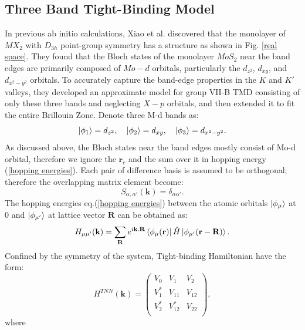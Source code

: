 \documentclass[12pt,english,a4paper]{article}
\begin{document}
	\subsection{Three Band Tight-Binding Model}
	\quad In previous ab initio calculations\cite{xiao_coupled_2012,mattheiss_band_1973,lebegue_electronic_2009,zhu_giant_2011,ataca_stable_2012}, Xiao et al. discovered that the monolayer of $MX_2$ with $D_{3h}$ point-group symmetry has a structure as shown in Fig. \ref{real space}. They found that the Bloch states of the monolayer $MoS_2$ near the band edges are primarily composed of $Mo-d$ orbitals, particularly the $d_{z^2}$, $d_{xy}$, and $d_{x^2-y^2}$ orbitals. To accurately capture the band-edge properties in the $K$ and $K'$ valleys, they developed an approximate model for group VII-B TMD consisting of only these three bands and neglecting $X-p$ orbitals, and then extended it to fit the entire Brillouin Zone\cite{liu_three-band_2013}. Denote three M-d bands as:
	\begin{equation}
		\ket{\phi_{1}} = d_{z^2},\quad \ket{\phi_2} = d_{xy}, \quad \ket{\phi_3} = d_{x^2- y^2}.
	\end{equation}
	\quad As discussed above, the Bloch states near the band edges mostly consist of Mo-d orbital, therefore we ignore the $\textbf{r}_c$ and the sum over it in hopping energy (\ref{hopping energies}). Each pair of difference basis is assumed to be orthogonal; therefore the overlapping matrix element become:
	$$S_{\alpha, \alpha'}(\textbf{k}) = \delta_{\alpha \alpha'}.$$
	\quad The hopping energies eq.(\ref{hopping energies}) between the atomic orbitals $\ket{\phi_{\mu}}$ at 0 and $\ket{\phi_{\mu'}}$ at lattice vector $\textbf{R}$ can be obtained as: $$H_{\mu \mu'}(\textbf{k}) =\sum_{\textbf{R}} e^{i\textbf{k}.\textbf{R}}  \bra{\phi_{\mu}(\textbf{r})}  \hat{H} \ket{\phi_{\mu'}(\textbf{r}-\textbf{R})}.$$
	\quad Confined by the symmetry of the system, Tight-binding Hamiltonian have the form:
	\begin{equation}
		H^{TNN}(\textbf{k}) =
		\begin{pmatrix}
			V_0  & V_1   & V_2 \\
			V_1^*& V_{11}& V_{12} \\
			V_2^*& V_{12}^* & V_{22} \\
		\end{pmatrix},
	\end{equation}
	where
\end{document}
